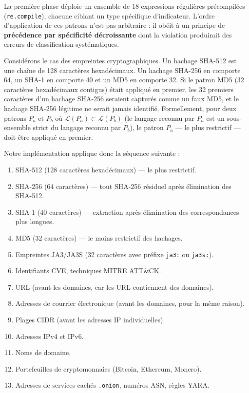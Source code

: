 La première phase déploie un ensemble de 18 expressions régulières précompilées (\texttt{re.compile}), chacune ciblant un type spécifique d'indicateur. L'ordre d'application de ces patrons n'est pas arbitraire : il obéit à un principe de \textbf{précédence par spécificité décroissante} dont la violation produirait des erreurs de classification systématiques.

Considérons le cas des empreintes cryptographiques. Un hachage SHA-512 est une chaîne de 128 caractères hexadécimaux. Un hachage SHA-256 en comporte 64, un SHA-1 en comporte 40 et un MD5 en comporte 32. Si le patron MD5 (32 caractères hexadécimaux contigus) était appliqué en premier, les 32 premiers caractères d'un hachage SHA-256 seraient capturés comme un faux MD5, et le hachage SHA-256 légitime ne serait jamais identifié. Formellement, pour deux patrons $P_a$ et $P_b$ où $\mathcal{L}(P_a) \subset \mathcal{L}(P_b)$ (le langage reconnu par $P_a$ est un sous-ensemble strict du langage reconnu par $P_b$), le patron $P_a$ --- le plus restrictif --- doit être appliqué en premier.

Notre implémentation applique donc la séquence suivante :

\begin{enumerate}
    \item SHA-512 (128 caractères hexadécimaux) --- le plus restrictif.
    \item SHA-256 (64 caractères) --- tout SHA-256 résiduel après élimination des SHA-512.
    \item SHA-1 (40 caractères) --- extraction après élimination des correspondances plus longues.
    \item MD5 (32 caractères) --- le moins restrictif des hachages.
    \item Empreintes JA3/JA3S (32 caractères avec préfixe \texttt{ja3:} ou \texttt{ja3s:}).
    \item Identifiants CVE, techniques MITRE ATT\&CK.
    \item URL (avant les domaines, car les URL contiennent des domaines).
    \item Adresses de courrier électronique (avant les domaines, pour la même raison).
    \item Plages CIDR (avant les adresses IP individuelles).
    \item Adresses IPv4 et IPv6.
    \item Noms de domaine.
    \item Portefeuilles de cryptomonnaies (Bitcoin, Ethereum, Monero).
    \item Adresses de services cachés \texttt{.onion}, numéros ASN, règles YARA.
\end{enumerate}

